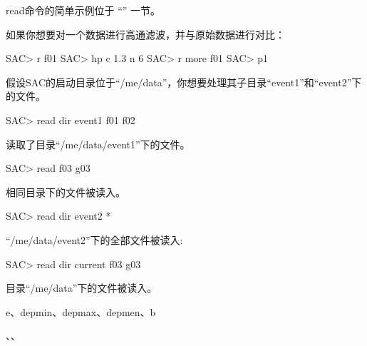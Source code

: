 read命令的简单示例位于 ``'' 一节。

如果你想要对一个数据进行高通滤波，并与原始数据进行对比：
\begin{SACCode}
SAC> r f01
SAC> hp c 1.3 n 6
SAC> r more f01
SAC> p1
\end{SACCode}

假设SAC的启动目录位于``/me/data''，你想要处理其子目录``event1''和``event2''下的文件。
\begin{SACCode}
SAC> read dir event1 f01 f02
\end{SACCode}
读取了目录``/me/data/event1''下的文件。

\begin{SACCode}
SAC> read f03 g03
\end{SACCode}
相同目录下的文件被读入。

\begin{SACCode}
SAC> read dir event2 *
\end{SACCode}
``/me/data/event2''下的全部文件被读入:

\begin{SACCode}
SAC> read dir current f03 g03
\end{SACCode}
目录``/me/data''下的文件被读入。

e、depmin、depmax、depmen、b

、、
